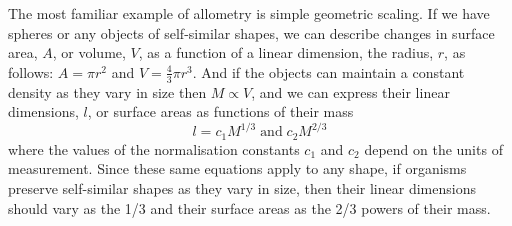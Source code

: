 \documentclass[a4paper]{article} %
\begin{document}
        The most familiar example of allometry is simple geometric scaling. If we have spheres or any objects of self-similar shapes, we can describe changes in surface area, $A$, or volume, $V$, as a function of a linear dimension, the radius, $r$, as follows: $A = \pi r^2$ and $V = \frac{4}{3}\pi r^3$. And if the objects can maintain a constant density as they vary in size then $M \propto V$, and we can express their linear dimensions, $l$, or surface areas as functions of their mass
        \begin{equation}
            l = c_{1}M^{1/3} \; \text{and} \; c_{2}M^{2/3}
        \end{equation}
        where the values of the normalisation constants $c_1$ and $c_2$ depend on the units of measurement. Since these same equations apply to any shape, if organisms preserve self-similar shapes as they vary in size, then their linear dimensions should vary as the 1/3 and their surface areas as the 2/3 powers of their mass.
        
\end{document}
